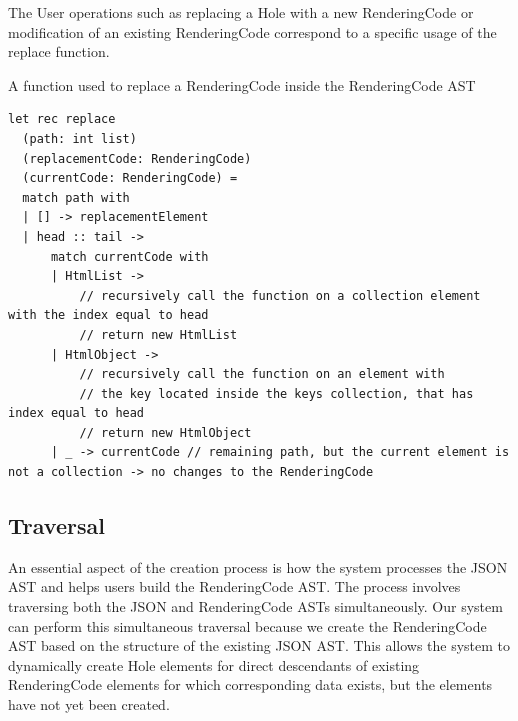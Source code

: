 The User operations such as replacing a Hole with a new RenderingCode or modification of an existing RenderingCode correspond to a specific usage of the replace function.
\begin{listing}[htbp]
	\caption {A function used to replace a RenderingCode inside the RenderingCode AST}
	\label{fig:replace}
	\begin{lstlisting}
let rec replace 
  (path: int list) 
  (replacementCode: RenderingCode) 
  (currentCode: RenderingCode) =
  match path with
  | [] -> replacementElement
  | head :: tail ->
      match currentCode with
      | HtmlList ->
          // recursively call the function on a collection element with the index equal to head 
          // return new HtmlList
      | HtmlObject ->
          // recursively call the function on an element with 
          // the key located inside the keys collection, that has index equal to head
          // return new HtmlObject
      | _ -> currentCode // remaining path, but the current element is not a collection -> no changes to the RenderingCode
  \end{lstlisting}
\end{listing}



\subsection{Traversal}
\label{sec:traversal}
An essential aspect of the creation process is how the system processes the JSON AST and helps users build the RenderingCode AST.
The process involves traversing both the JSON and RenderingCode ASTs simultaneously.
Our system can perform this simultaneous traversal because we create the RenderingCode AST based on the structure of the existing JSON AST.
This allows the system to dynamically create Hole elements for direct descendants of existing RenderingCode elements for which corresponding data exists, but the elements have not yet been created.

